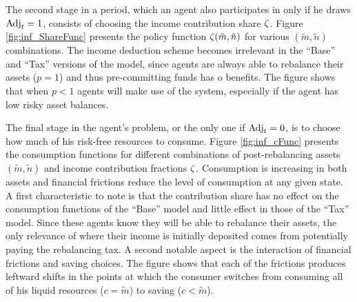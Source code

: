 \documentclass[./RiskyContrib.tex]{subfiles}
\begin{document}


The second stage in a period, which an agent also participates in only if
he draws $\text{Adj}_t = 1$, consists of choosing the income contribution share $\zeta$.
Figure \ref{fig:inf_ShareFunc} presents the policy function $\zeta(\tilde{m},\tilde{n})$
for various $(\tilde{m},\tilde{n})$ combinations. The income deduction scheme
becomes irrelevant in the ``Base'' and ``Tax'' versions of the model, since
agents are always able to rebalance their assets ($p=1$) and thus pre-committing
funds has o benefits. The figure shows that when $p<1$ agents will
make use of the system, especially if the agent has low risky asset balances.



The final stage in the agent's problem, or the only one if $\text{Adj}_t=0$, is
to choose how much of his risk-free resources to consume. Figure \ref{fig:inf_cFunc}
presents the consumption functions for different combinations of post-rebalancing
assets $(\tilde{m}, \tilde{n})$ and income contribution fractions $\zeta$. Consumption
is increasing in both assets and financial frictions reduce the
level of consumption at any given state. A first characteristic to note is that
the contribution share has no effect on the consumption functions of the ``Base'' model
and little effect in those of the ``Tax'' model. Since these agents know they will be
able to rebalance their assets, the only relevance of where their income is initially
deposited comes from potentially paying the rebalancing tax. A second notable aspect is
the interaction of financial frictions and saving choices. The figure shows that each
of the frictions produces leftward shifts in the points at which the consumer switches
from consuming all of his liquid resources ($c = \tilde{m}$) to saving ($c < \tilde{m}$).





\end{document}
